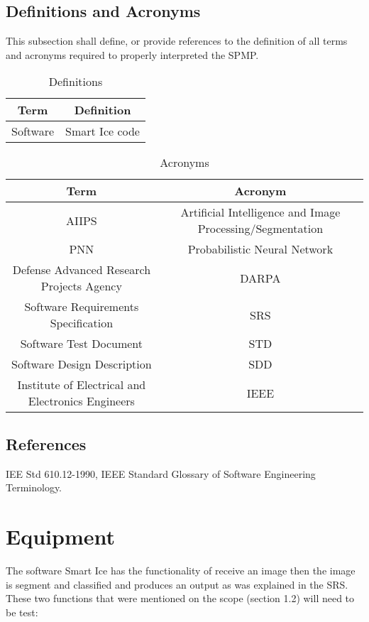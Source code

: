 \documentclass[12pt]{article}
\begin{document}
\subsection{Definitions and Acronyms}
This subsection shall define, or provide references to the definition of all terms and acronyms required to properly interpreted the SPMP.
\begin{table}[H]\centering
\begin{tabular}{|c|c|}
  \hline
  Term & Definition \\
   \hline
   Software & Smart Ice code\\
   \hline
\end{tabular}
\caption{Definitions}
\end{table}

\begin{table}[H]\centering
\begin{tabular}{|c|c|}
  \hline
  Term & Acronym \\
   \hline
   AIIPS & Artificial Intelligence and Image Processing/Segmentation   \\
    \hline
    PNN & Probabilistic Neural Network \\
    \hline
  Defense Advanced Research Projects Agency  & DARPA \\
   \hline
  Software Requirements Specification & SRS \\
   \hline
     Software Test Document & STD \\
   \hline
     Software Design Description & SDD \\
     \hline
     Institute of Electrical and Electronics Engineers & IEEE\\
   \hline
\end{tabular}
\caption{Acronyms}
\end{table}

\subsection{References}
IEE Std 610.12-1990, IEEE Standard Glossary of Software Engineering Terminology.

\section{Equipment}
The software Smart Ice has the functionality of receive an image then the image is segment and classified and produces an output as was explained in the SRS. These two functions that were mentioned on the scope (section 1.2) will need to be test:
\end{document}
